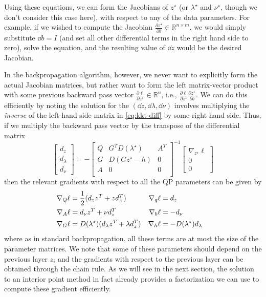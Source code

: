 Using these equations, we can form the Jacobians of $z^\star$ (or
$\lambda^\star$ and $\nu^\star$, though we don't consider this case here), with
respect to any of the data parameters.  For example, if we wished to compute the
Jacobian $\frac{\partial z^\star}{\partial b} \in \mathbb{R}^{n \times m}$, we
would simply substitute $\dd b = I$ (and set all other differential terms in
the right hand side to zero), solve the equation, and the resulting value of
$\dd z$ would be the desired Jacobian.

In the backpropagation algorithm, however, we never want to explicitly form the
actual Jacobian matrices, but rather want to form the left matrix-vector product
with some previous backward pass vector $\frac{\partial \ell}{\partial z^\star}
\in \mathbb{R}^n$, i.e., $\frac{\partial \ell}{\partial z^\star} \frac {\partial
z^\star}{\partial b}$.   We can do this efficiently by noting the
solution for the $(\dd z, \dd \lambda, \dd \nu)$ involves multiplying the \emph
{inverse} of the left-hand-side matrix in \eqref{eq:kkt-diff} by some right hand
side.  Thus, if we multiply the backward pass vector by the transpose of the
differential matrix
\begin{equation}
\label{eq-d-def}
\begin{bmatrix}
d_z \\ d_\lambda \\ d_\nu
\end{bmatrix}
=
-
\begin{bmatrix}
Q & G^T D(\lambda^\star) & A^T \\
G  & D(Gz^\star-h) & 0 \\
A & 0 & 0 \\
\end{bmatrix}^{-1}
\begin{bmatrix}
\nabla_{z^\star}\ell \\ 0 \\ 0
\end{bmatrix}
\end{equation}
then the relevant gradients with respect to all the QP parameters can be given by
\begin{equation}
  \hspace{-4mm}
  \begin{aligned}
    \nabla_Q \ell &= \frac{1}{2}(d_z z^T + zd_z^T)
    & \nabla_q \ell &= d_z \\
    \nabla_A \ell &= d_\nu z^T + \nu d_z^T
    & \nabla_b \ell &= -d_\nu \\
    \nabla_G \ell &= D(\lambda^\star)(d_\lambda z^T + \lambda d_z^T)
    & \nabla_h \ell &= -D(\lambda^\star) d_\lambda
  \end{aligned}
  \label{eq:grads}
\end{equation}
where as in standard backpropagation, all these terms are at most the size of
the parameter matrices.
We note that some of these parameters should depend on the previous layer
$z_i$ and the gradients with respect to the previous layer can
be obtained through the chain rule.
As we will see in the next section, the solution to an
interior point method in fact already provides a factorization we can use to
compute these gradient efficiently.

